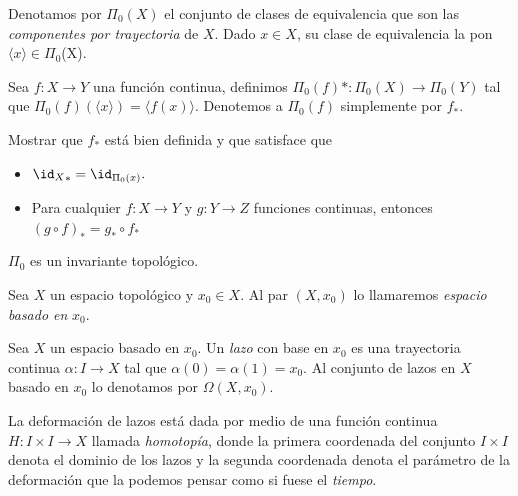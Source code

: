 
\begin{definicion}
    Denotamos por $\Pi_0(X)$ el conjunto de clases de equivalencia que son las \textit{componentes por trayectoria} de $X$. Dado $x\in X$, su clase de equivalencia la pon $\langle x\rangle \in \Pi_0$(X). 
\end{definicion}
\begin{definicion}
    Sea $f:X\to Y$ una función continua, definimos $\Pi_0(f)*:\Pi_0(X)\to \Pi_0(Y)$ tal que $\Pi_0(f)(\langle x\rangle)=\langle f(x)\rangle$. Denotemos a $\Pi_0(f)$ simplemente por $f_*$.
\end{definicion}
\begin{ejercicio}
    Mostrar que $f_*$ está bien definida y que satisface que
    \begin{itemize}
        \item [(1)] ${\id_X}_*=\id_{\Pi_0(x)}.$
        \item [(2)] Para cualquier $f:X\to Y$ y $g:Y\to Z$ funciones continuas, entonces $(g\circ f)_*=g_*\circ f_*$
    \end{itemize}
\end{ejercicio}
\begin{coro}
    $\Pi_0$ es un invariante topológico.
\end{coro}
\begin{definicion}
    Sea $X$ un espacio topológico y $x_0\in X$. Al par $(X,x_0)$ lo llamaremos \textit{espacio basado en} $x_0$.
\end{definicion}
\begin{definicion}
    Sea $X$ un espacio basado en $x_0$. Un \textit{lazo} con base en $x_0$ es una trayectoria continua $\alpha:I\to X$ tal que $\alpha(0)=\alpha(1)=x_0.$ Al conjunto de lazos en $X$ basado en $x_0$ lo denotamos por $\Omega(X,x_0).$
\end{definicion}
La deformación de lazos está dada por medio de una función continua $H:I\times I\to X$ llamada \textit{homotopía}, donde la primera coordenada del conjunto $I\times I$ denota el dominio de los lazos y la segunda coordenada denota el parámetro de la deformación que la podemos pensar como si fuese el \textit{tiempo}.
